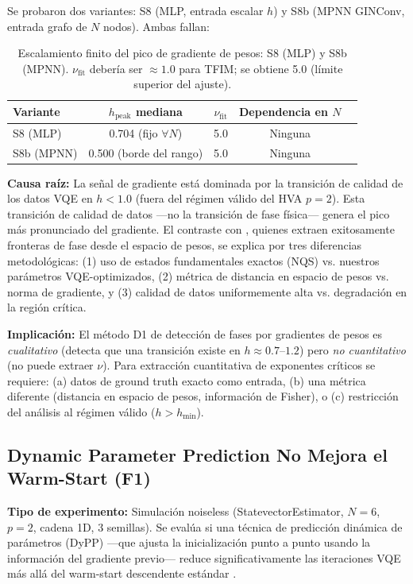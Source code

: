 \documentclass[11pt,a4paper,spanish]{book}
\begin{document}
Se probaron dos variantes: S8 (MLP, entrada escalar $h$) y S8b (MPNN GINConv, entrada grafo de $N$ nodos). Ambas fallan:

\begin{table}[h]
\centering
\label{tab:s8_scaling}
\begin{tabular}{lcccl}
\toprule
\textbf{Variante} & \textbf{$h_{\text{peak}}$ mediana} & \textbf{$\nu_{\text{fit}}$} & \textbf{Dependencia en $N$} \\
\midrule
S8 (MLP) & 0.704 (fijo $\forall N$) & 5.0 & Ninguna \\
S8b (MPNN) & 0.500 (borde del rango) & 5.0 & Ninguna \\
\bottomrule
\end{tabular}
\caption{Escalamiento finito del pico de gradiente de pesos: S8 (MLP) y S8b (MPNN). $\nu_{\text{fit}}$ debería ser $\approx 1.0$ para TFIM; se obtiene 5.0 (límite superior del ajuste).}

\end{table}

\textbf{Causa raíz:} La señal de gradiente está dominada por la transición de calidad de los datos VQE en $h < 1.0$ (fuera del régimen válido del HVA $p = 2$). Esta transición de calidad de datos ---no la transición de fase física--- genera el pico más pronunciado del gradiente. El contraste con \citet{hernandes2025}, quienes extraen exitosamente fronteras de fase desde el espacio de pesos, se explica por tres diferencias metodológicas: (1) uso de estados fundamentales exactos (NQS) vs. nuestros parámetros VQE-optimizados, (2) métrica de distancia en espacio de pesos vs. norma de gradiente, y (3) calidad de datos uniformemente alta vs. degradación en la región crítica.

\textbf{Implicación:} El método D1 de detección de fases por gradientes de pesos es \emph{cualitativo} (detecta que una transición existe en $h \approx 0.7$--$1.2$) pero \emph{no cuantitativo} (no puede extraer $\nu$). Para extracción cuantitativa de exponentes críticos se requiere: (a) datos de ground truth exacto como entrada, (b) una métrica diferente (distancia en espacio de pesos, información de Fisher), o (c) restricción del análisis al régimen válido ($h > h_{\min}$).

\subsection{Dynamic Parameter Prediction No Mejora el Warm-Start (F1)}

\textbf{Tipo de experimento:} Simulación noiseless (StatevectorEstimator, $N = 6$, $p = 2$, cadena 1D, 3 semillas). Se evalúa si una técnica de predicción dinámica de parámetros (DyPP) ---que ajusta la inicialización punto a punto usando la información del gradiente previo--- reduce significativamente las iteraciones VQE más allá del warm-start descendente estándar \citep{puig2025}.
\end{document}
